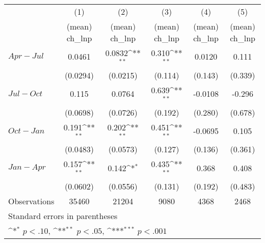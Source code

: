 {
\def\sym#1{\ifmmode^{#1}\else\(^{#1}\)\fi}
\begin{tabular}{l*{5}{c}}
\hline\hline
                    &\multicolumn{1}{c}{(1)}&\multicolumn{1}{c}{(2)}&\multicolumn{1}{c}{(3)}&\multicolumn{1}{c}{(4)}&\multicolumn{1}{c}{(5)}\\
                    &\multicolumn{1}{c}{(mean) ch\_lnp}&\multicolumn{1}{c}{(mean) ch\_lnp}&\multicolumn{1}{c}{(mean) ch\_lnp}&\multicolumn{1}{c}{(mean) ch\_lnp}&\multicolumn{1}{c}{(mean) ch\_lnp}\\
\hline
 $ Apr-Jul $        &      0.0461         &      0.0832\sym{**} &       0.310\sym{**} &      0.0120         &       0.111         \\
                    &    (0.0294)         &    (0.0215)         &     (0.114)         &     (0.143)         &     (0.339)         \\
[1em]
 $ Jul-Oct $        &       0.115         &      0.0764         &       0.639\sym{**} &     -0.0108         &      -0.296         \\
                    &    (0.0698)         &    (0.0726)         &     (0.192)         &     (0.280)         &     (0.678)         \\
[1em]
 $ Oct-Jan $        &       0.191\sym{**} &       0.202\sym{**} &       0.451\sym{**} &     -0.0695         &       0.105         \\
                    &    (0.0483)         &    (0.0573)         &     (0.127)         &     (0.136)         &     (0.361)         \\
[1em]
 $ Jan-Apr $        &       0.157\sym{**} &       0.142\sym{*}  &       0.435\sym{**} &       0.368         &       0.408         \\
                    &    (0.0602)         &    (0.0556)         &     (0.131)         &     (0.192)         &     (0.483)         \\
\hline
Observations        &       35460         &       21204         &        9080         &        4368         &        2468         \\
\hline\hline
\multicolumn{6}{l}{\footnotesize Standard errors in parentheses}\\
\multicolumn{6}{l}{\footnotesize \sym{*} \(p<.10\), \sym{**} \(p<.05\), \sym{***} \(p<.001\)}\\
\end{tabular}
}
